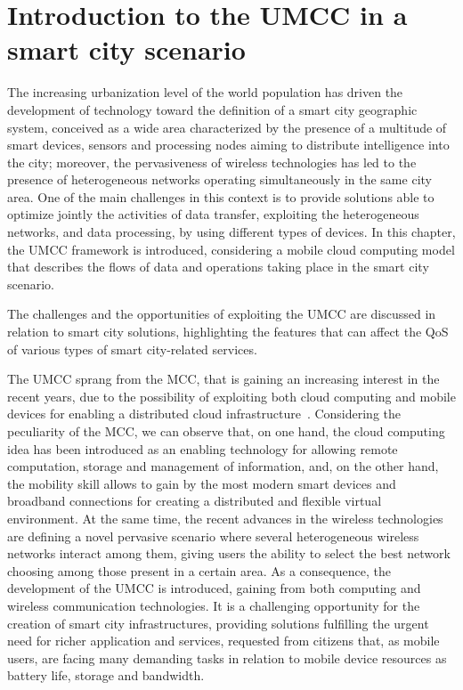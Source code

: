 \documentclass[twoside,openright]{report}
\begin{document}
\section{Introduction to the UMCC in a smart city scenario}
The increasing urbanization level of the world population has driven the development of technology toward the definition of a smart city geographic system, conceived as a wide area characterized by the presence of a multitude of smart devices, sensors and processing nodes aiming to distribute intelligence into the city; moreover, the pervasiveness of wireless technologies has led to the presence of heterogeneous networks operating simultaneously in the same city area. 
One of the main challenges in this context is to provide solutions able to optimize jointly the activities of data transfer, exploiting the heterogeneous networks, and data  processing, by using different types of devices. 
In this chapter, the \gls{UMCC} framework is introduced, considering a mobile cloud computing model that describes the flows of data and operations taking place in the smart city scenario. 

The challenges and the opportunities of exploiting the \gls{UMCC} are discussed in relation to smart city solutions, highlighting the features that can affect the \gls{QoS} of various types of smart city-related services.

The  \gls{UMCC} sprang from the \gls{MCC}, that is gaining an increasing interest in the recent years, due to the possibility of exploiting both cloud computing and mobile devices for enabling a distributed cloud infrastructure~\cite{DinhSurvey}. 
Considering the peculiarity of the  \gls{MCC}, we can observe that, on one hand, the cloud computing idea has been introduced as an enabling technology for allowing remote computation, storage and management of information, and, on the other hand, the mobility skill allows to gain by the most modern smart devices and broadband connections for creating a distributed and flexible virtual environment. 
At the same time, the recent advances in the wireless technologies are defining a novel pervasive scenario where several heterogeneous wireless networks interact among them, giving users the ability to select the best network choosing among those present in a certain area.
As a consequence, the development of the \gls{UMCC} is introduced, gaining from both computing and wireless communication technologies. It is a challenging opportunity for the creation of smart city infrastructures, providing solutions fulfilling the urgent need for richer application and services, requested from citizens that, as mobile users, are facing many demanding tasks in relation to mobile device resources as battery life, storage and bandwidth. 
\end{document}
